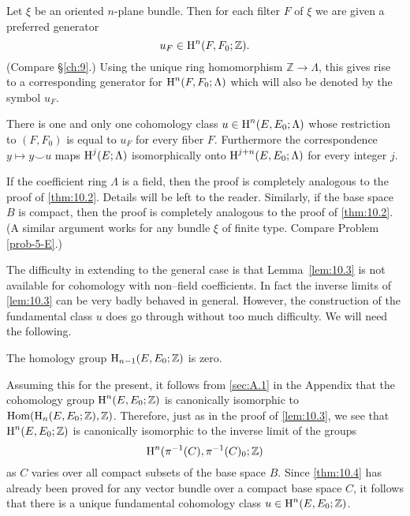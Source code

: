 \documentclass[../main]{subfiles}
\begin{document}
Let $\xi$ be an oriented $n$-plane bundle. Then for each filter $F$ of $\xi$ we are given a preferred generator \[u_F \in \operatorname{H}^n(F, F_0; \mathbb Z). \] (Compare \S\ref{ch:9}.) Using the unique ring homomorphism $\mathbb Z \longrightarrow \Lambda$, this gives rise to a corresponding generator for $\operatorname{H}^n(F, F_0; \Lambda)$ which will also be denoted by the symbol $u_F$. 
\begin{theorem}
\label{thm:10.4}
There is one and only one cohomology class $u \in \operatorname{H}^n(E, E_0; \Lambda)$ whose restriction to $(F, F_0)$ is equal to $u_F$ for every fiber $F$. Furthermore the correspondence $y \mapsto y \smile u$ maps $\operatorname{H}^j(E; \Lambda)$ isomorphically onto $\operatorname{H}^{j + n}(E, E_0; \Lambda)$ for every integer $j$. 
\end{theorem}
If the coefficient ring $\Lambda$ is a field, then the proof is completely analogous to the proof of \ref{thm:10.2}. Details will be left to the reader. Similarly, if the base space $B$ is compact, then the proof is completely analogous to the proof of \ref{thm:10.2}. (A similar argument works for any bundle $\xi$ of finite type. Compare Problem \ref{prob-5-E}.) 

The difficulty in extending to the general case is that Lemma~\ref{lem:10.3} is not available for cohomology with non--field coefficients. In fact the inverse limits of \ref{lem:10.3} can be very badly behaved in general. However, the construction of the fundamental class $u$ does go through without too much difficulty. We will need the following.

\begin{lemma}
\label{lem:10.5}
The homology group $\operatorname{H}_{n - 1}(E, E_0; \mathbb Z)$ is zero.
\end{lemma}

Assuming this for the present, it follows from \ref{sec:A.1} in the Appendix that the cohomology group $\operatorname{H}^n(E, E_0; \mathbb Z)$ is canonically isomorphic to $\operatorname{Hom}(\operatorname{H}_n(E, E_0; \mathbb Z), \mathbb Z)$. Therefore, just as in the proof of \ref{lem:10.3}, we see that $\operatorname{H}^n(E, E_0; \mathbb Z)$ is canonically isomorphic to the inverse limit of the groups \[\operatorname{H}^n(\pi^{-1}(C), \pi^{-1}(C)_0; \mathbb Z)\] as $C$ varies over all compact subsets of the base space $B$. Since \ref{thm:10.4} has already been proved for any vector bundle over a compact base space $C$, it follows that there is a unique fundamental cohomology class $u \in \operatorname{H}^n(E, E_0; \mathbb Z)$. 
\end{document}

